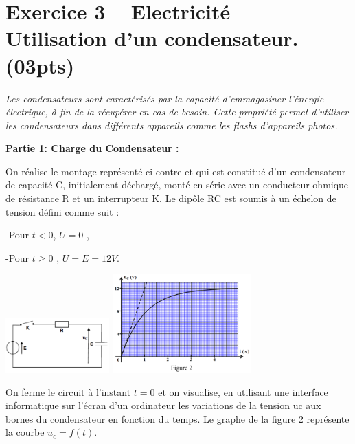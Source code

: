 \documentclass[12pt]{article}
\begin{document}
\section*{Exercice 3 – Electricité – Utilisation d'un condensateur. \dotfill(03pts)}

\emph{Les condensateurs sont caractérisés par la capacité d’emmagasiner l’énergie
électrique, à fin de la récupérer en cas de besoin. Cette propriété permet d’utiliser
les condensateurs dans différents appareils comme les flashs d’appareils photos.}


\hspace{-1cm}\textbf{Partie 1:  Charge du Condensateur :\dotfill}

On réalise le montage représenté ci-contre et
qui est constitué d’un condensateur de capacité
C, initialement déchargé, monté en série avec
un conducteur ohmique de résistance R et un
interrupteur K.
Le dipôle RC est soumis à un échelon de tension défini comme suit : 

-Pour $t < 0$, $U=0$ , 

-Pour $t\geq 0$ , $U=E=12V$.

\begin{center}
	  \vspace{-1cm}
	\includegraphics[width=0.3\textwidth]{./img/RC00.png}
	\includegraphics[width=0.4\textwidth]{./img/RC01.png}
  \end{center}

On ferme le circuit à l’instant
$t = 0$ et on visualise, en
utilisant une interface
informatique sur l’écran d’un
ordinateur les variations de la
tension uc aux bornes du
condensateur en fonction du
temps.
Le graphe de la figure 2
représente la courbe $u_c = f(t)$.
\end{document}
